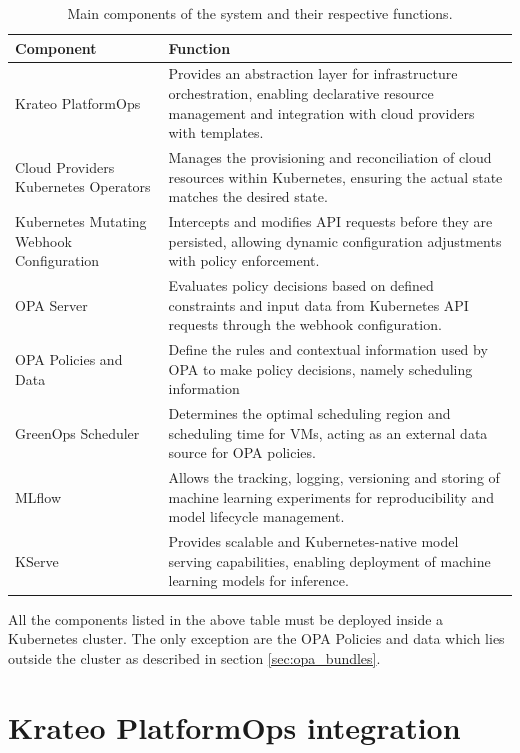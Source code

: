 \begin{table}[H]
  \centering
  \renewcommand{\arraystretch}{1.3} %
  \begin{tabularx}{\textwidth}{| l | X |} %
    \hline
    \textbf{Component} & \textbf{Function} \\
    \hline
    Krateo PlatformOps & Provides an abstraction layer for infrastructure orchestration, enabling declarative resource management and integration with cloud providers with templates. \\
    \hline
    Cloud Providers Kubernetes Operators & Manages the provisioning and reconciliation of cloud resources within Kubernetes, ensuring the actual state matches the desired state. \\
    \hline
    Kubernetes Mutating Webhook Configuration & Intercepts and modifies API requests before they are persisted, allowing dynamic configuration adjustments with policy enforcement. \\
    \hline
    OPA Server & Evaluates policy decisions based on defined constraints and input data from Kubernetes API requests through the webhook configuration. \\
    \hline
    OPA Policies and Data & Define the rules and contextual information used by OPA to make policy decisions, namely scheduling information \\
    \hline
    GreenOps Scheduler & Determines the optimal scheduling region and scheduling time for VMs, acting as an external data source for OPA policies. \\
    \hline
    MLflow & Allows the tracking, logging, versioning and storing of machine learning experiments for reproducibility and model lifecycle management. \\
    \hline
    KServe & Provides scalable and Kubernetes-native model serving capabilities, enabling deployment of machine learning models for inference. \\
    \hline
  \end{tabularx}
  \caption{Main components of the system and their respective functions.}
  \label{tab:system_components}
\end{table}

All the components listed in the above table must be deployed inside a Kubernetes cluster. The only exception are the OPA Policies and data which lies outside the cluster as described in section \ref{sec:opa_bundles}.

\section{Krateo PlatformOps integration}
\label{sec:krateo_integration}

